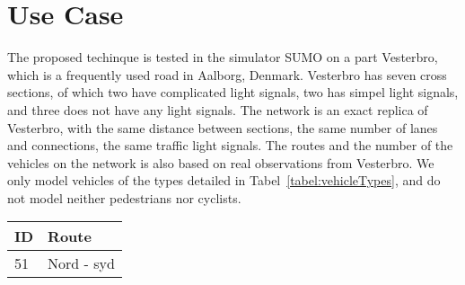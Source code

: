\section{Use Case}
The proposed techinque is tested in the simulator SUMO on a part Vesterbro, which is a frequently used road in Aalborg, Denmark.
Vesterbro has seven cross sections, of which two have complicated light signals, two has simpel light signals, and three does not have any light signals. %
The network is an exact replica of Vesterbro, with the same distance between sections, the same number of lanes and connections, the same traffic light signals.
The routes and the number of the vehicles on the network is also based on real observations from Vesterbro.
We only model vehicles of the types detailed in Tabel~\ref{tabel:vehicleTypes}, and do not model neither pedestrians nor cyclists.

\begin{tabular}{|l|l|}\hline
\textbf{ID} & \textbf{Route}\\\hline
51 & Nord - syd\\\hline
\end{tabular}